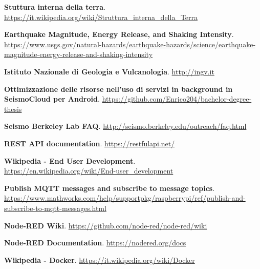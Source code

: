 \documentclass[a4paper,10pt]{memoir}
\begin{document}
\begin{thebibliography}{9}

  \textbf{Stuttura interna della terra}.\\
  \href{https://it.wikipedia.org/wiki/Struttura_interna_della_Terra}{https://it.wikipedia.org/wiki/Struttura\_interna\_della\_Terra}

  \textbf{Earthquake Magnitude, Energy Release, and Shaking Intensity}.\\
  \href{https://www.usgs.gov/natural-hazards/earthquake-hazards/science/earthquake-magnitude-energy-release-and-shaking-intensity}{https://www.usgs.gov/natural-hazards/earthquake-hazards/science/earthquake-magnitude-energy-release-and-shaking-intensity}

  \textbf{Istituto Nazionale di Geologia e Vulcanologia}.
  \href{http://ingv.it}{http://ingv.it}

  \textbf{Ottimizzazione delle risorse nell’uso di servizi in background in SeismoCloud per Android}.
  \href{https://github.com/Enrico204/bachelor-degree-thesis}{https://github.com/Enrico204/bachelor-degree-thesis}

  \textbf{Seismo Berkeley Lab FAQ}.
  \href{http://seismo.berkeley.edu/outreach/faq.html}{http://seismo.berkeley.edu/outreach/faq.html}

  \textbf{REST API documentation}.
  \href{https://restfulapi.net/}{https://restfulapi.net/}

  \textbf{Wikipedia - End User Development}.\\
  \href{https://en.wikipedia.org/wiki/End-user_development}{https://en.wikipedia.org/wiki/End-user\_development}

  \textbf{Publish MQTT messages and subscribe to message topics}.\\
  \href{https://www.mathworks.com/help/supportpkg/raspberrypi/ref/publish-and-subscribe-to-mqtt-messages.html}{https://www.mathworks.com/help/supportpkg/raspberrypi/ref/publish-and-subscribe-to-mqtt-messages.html}

  \textbf{Node-RED Wiki}.
  \href{https://github.com/node-red/node-red/wiki}{https://github.com/node-red/node-red/wiki}

  \textbf{Node-RED Documentation}.
  \href{https://nodered.org/docs}{https://nodered.org/docs}

  \textbf{Wikipedia - Docker}.
  \href{https://it.wikipedia.org/wiki/Docker/}{https://it.wikipedia.org/wiki/Docker}


\end{thebibliography}
\end{document}
